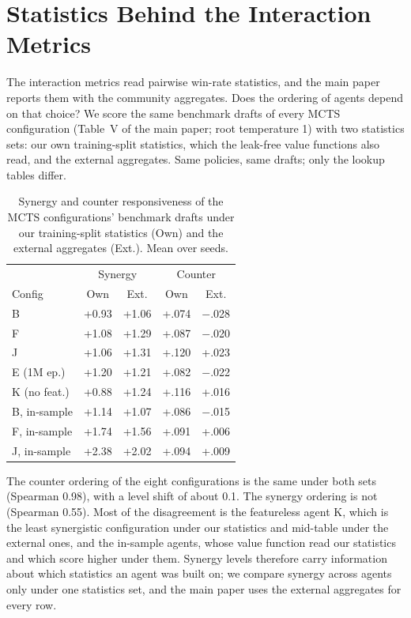 \documentclass[journal]{IEEEtran}
\begin{document}
\section{Statistics Behind the Interaction Metrics}
\label{sec:statsens}

The interaction metrics read pairwise win-rate statistics, and the main paper reports them with the community aggregates. Does the ordering of agents depend on that choice? We score the same benchmark drafts of every MCTS configuration (Table~V of the main paper; root temperature 1) with two statistics sets: our own training-split statistics, which the leak-free value functions also read, and the external aggregates. Same policies, same drafts; only the lookup tables differ.

\begin{table}[t]
\centering
\caption{Synergy and counter responsiveness of the MCTS configurations' benchmark drafts under our training-split statistics (Own) and the external aggregates (Ext.). Mean over seeds.}
\label{tab:statsens}
\setlength{\tabcolsep}{3.5pt}
\small
\begin{tabular}{lcccc}
\toprule
& \multicolumn{2}{c}{Synergy} & \multicolumn{2}{c}{Counter} \\
Config & Own & Ext. & Own & Ext. \\
\midrule
B & +0.93 & +1.06 & +.074 & $-$.028 \\
F & +1.08 & +1.29 & +.087 & $-$.020 \\
J & +1.06 & +1.31 & +.120 & +.023 \\
E (1M ep.) & +1.20 & +1.21 & +.082 & $-$.022 \\
K (no feat.) & +0.88 & +1.24 & +.116 & +.016 \\
B, in-sample & +1.14 & +1.07 & +.086 & $-$.015 \\
F, in-sample & +1.74 & +1.56 & +.091 & +.006 \\
J, in-sample & +2.38 & +2.02 & +.094 & +.009 \\
\bottomrule
\end{tabular}
\end{table}

The counter ordering of the eight configurations is the same under both sets (Spearman 0.98), with a level shift of about 0.1. The synergy ordering is not (Spearman 0.55). Most of the disagreement is the featureless agent K, which is the least synergistic configuration under our statistics and mid-table under the external ones, and the in-sample agents, whose value function read our statistics and which score higher under them. Synergy levels therefore carry information about which statistics an agent was built on; we compare synergy across agents only under one statistics set, and the main paper uses the external aggregates for every row.
\end{document}
